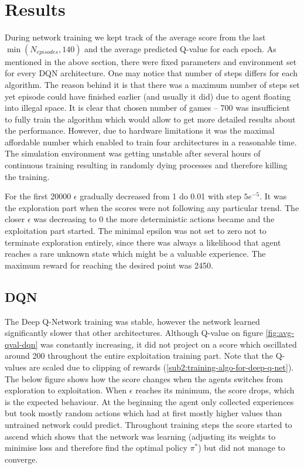 \chapter{Results}
\label{cha:results}

During network training we kept track of the average score from the last $\min(N_{episodes}, 140)$ and the average predicted Q-value
for each epoch. As mentioned in the above section, there were fixed parameters and environment set for every DQN architecture. One may
notice that number of steps differs for each algorithm. The reason behind it is that there was a maximum number of steps set yet
episode could have finished earlier (and usually it did)  due to agent floating into illegal space. It is clear that chosen number of
games -- 700 was insufficient to fully train the algorithm which would allow to get more detailed results about the performance.
However, due to hardware limitations it was the maximal affordable number which enabled to train four architectures in a reasonable
time. The simulation environment was getting unstable after several hours of continuous training resulting in randomly dying processes
and therefore killing the training.

For the first 20000 $\epsilon$ gradually decreased from 1 do 0.01 with step $5e^{-5}$. It was the exploration part when the scores were
not following any particular trend. The closer $\epsilon$ was decreasing to 0 the more deterministic actions became and the
exploitation part started. The minimal epsilon was not set to zero not to terminate exploration entirely, since there was always a
likelihood that agent reaches a rare unknown state which might be a valuable experience. The maximum reward for reaching the desired
point was 2450.

\section{DQN}
\label{sec:results-dqn}

The Deep Q-Network training was stable, however the network learned significantly slower that other architectures. Although Q-value on
figure \ref{fig:avg-qval-dqn} was constantly increasing, it did not project on a score which oscillated around 200 throughout the
entire exploitation training part. Note that the Q-values are scaled due to clipping of rewards (\ref{sub2:training-algo-for-deep-q-net}). The below figure shows how the score changes when the agents switches from exploration to
exploitation. When $\epsilon$ reaches its minimum, the score drops, which is the expected behaviour. At the beginning the agent only
collected experiences but took mostly random actions which had at first mostly higher values than untrained network could predict.
Throughout training steps the score started to ascend which shows that the network was learning (adjusting its weights to minimise loss
and therefore find the optimal policy $\pi^*$) but did not manage to converge.

